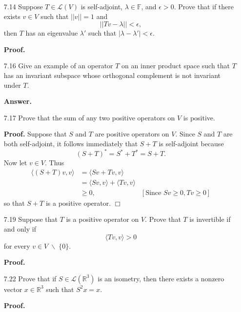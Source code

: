 \documentclass[9pt]{article}
\newcommand{\qed}{\hfill \ensuremath{\Box}}
\newcommand{\F}{\mathbb{F}}
\newcommand{\R}{\mathbb{R}}
\newcommand{\cyc}[1]{\langle #1 \rangle}
\begin{document}
\begin{enumerate}
   \item[7.14] Suppose $T \in \mathcal{L}(V)$ is self-adjoint, $\lambda \in \F$,
               and $\epsilon > 0$. Prove that if there exists $v \in V$ such
               that $||v|| = 1$ and
               $$||Tv - \lambda|| < \epsilon,$$
               then $T$ has an eigenvalue $\lambda'$ such that
               $|\lambda - \lambda'| < \epsilon$.
               
      \textbf{Proof.}
   \item[7.16] Give an example of an operator $T$ on an inner product space such
               that $T$ has an invariant subspace whose orthogonal complement is
               not invariant under $T$.

      \textbf{Answer.}
   \item[7.17] Prove that the sum of any two positive operators on $V$ is
               positive.

      \textbf{Proof.} Suppose that $S$ and $T$ are positive operators on $V$.
      Since $S$ and $T$ are both self-adjoint, it follows immediately that
      $S + T$ is self-adjoint because
      $$(S+T)^* = S^*+T^* = S + T.$$
      Now let $v \in V$. Thus
      \begin{align*}
         \cyc{(S+T)v,v} &= \cyc{Sv + Tv, v} \\
            &= \cyc{Sv, v} + \cyc{Tv, v} \\
            &\ge 0, &[\text{Since } Sv \ge 0, Tv \ge 0]
      \end{align*}
      so that $S + T$ is a positive operator. \qed
   \item[7.19] Suppose that $T$ is a positive operator on $V$. Prove that $T$ is
               invertible if and only if
               $$\cyc{Tv, v} > 0$$
               for every $v \in V\;\backslash\;\{0\}$.

      \textbf{Proof.}
      
   \item[7.22] Prove that if $S \in \mathcal{L}(\R^3)$ is an isometry, then
               there exists a nonzero vector $x \in \R^3$ such that $S^2x = x$.

      \textbf{Proof.} 
\end{enumerate}
\end{document}
